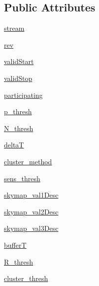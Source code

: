 \subsection*{Public Attributes}
\begin{DoxyCompactItemize}
\item 
\hyperlink{classamonpy_1_1dbase_1_1db__classes_1_1_alert_config_a5181b25cd2b3960297851cac7538eeb5}{stream}
\item 
\hyperlink{classamonpy_1_1dbase_1_1db__classes_1_1_alert_config_a73ac175f4751ace5efefa98ccbfc0785}{rev}
\item 
\hyperlink{classamonpy_1_1dbase_1_1db__classes_1_1_alert_config_ac4d6388204f392c5838eb2902a5cf263}{valid\-Start}
\item 
\hyperlink{classamonpy_1_1dbase_1_1db__classes_1_1_alert_config_af8bb43caa61b4c962ea2e96dc8722461}{valid\-Stop}
\item 
\hyperlink{classamonpy_1_1dbase_1_1db__classes_1_1_alert_config_a39184be5dae1af25cad32181fbe17c61}{participating}
\item 
\hyperlink{classamonpy_1_1dbase_1_1db__classes_1_1_alert_config_a16d50003ae8ad8876cc0a7cb283c6968}{p\-\_\-thresh}
\item 
\hyperlink{classamonpy_1_1dbase_1_1db__classes_1_1_alert_config_aec4a19cdc1a4fa7269378278fe36bce3}{N\-\_\-thresh}
\item 
\hyperlink{classamonpy_1_1dbase_1_1db__classes_1_1_alert_config_ae6ec661f2f82ef7d84f6285a6feacaa9}{delta\-T}
\item 
\hyperlink{classamonpy_1_1dbase_1_1db__classes_1_1_alert_config_aeb4dd54c70c114a00192659ba9881a9b}{cluster\-\_\-method}
\item 
\hyperlink{classamonpy_1_1dbase_1_1db__classes_1_1_alert_config_acfdfd05a7551c6ee13a4c04970a5b496}{sens\-\_\-thresh}
\item 
\hyperlink{classamonpy_1_1dbase_1_1db__classes_1_1_alert_config_a73eaa3edce9df7437c2f385e5ffcdc27}{skymap\-\_\-val1\-Desc}
\item 
\hyperlink{classamonpy_1_1dbase_1_1db__classes_1_1_alert_config_ad123a3f944545c402b09637d5fd3068a}{skymap\-\_\-val2\-Desc}
\item 
\hyperlink{classamonpy_1_1dbase_1_1db__classes_1_1_alert_config_a5150e8d288983b9436a2d356c33537cc}{skymap\-\_\-val3\-Desc}
\item 
\hyperlink{classamonpy_1_1dbase_1_1db__classes_1_1_alert_config_af0aff8769055be290414b5bd6364d180}{buffer\-T}
\item 
\hyperlink{classamonpy_1_1dbase_1_1db__classes_1_1_alert_config_aaede4885574230fc56b90fc989230a85}{R\-\_\-thresh}
\item 
\hyperlink{classamonpy_1_1dbase_1_1db__classes_1_1_alert_config_ac3cf39c10bcacbd6209f3175788168f6}{cluster\-\_\-thresh}
\end{DoxyCompactItemize}
